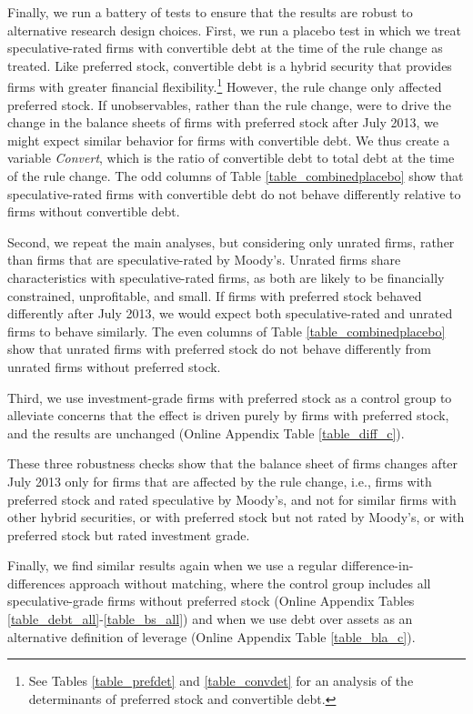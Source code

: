 \documentclass[a4paper, 12pt]{article}
\begin{document}
Finally, we run a battery of tests to ensure that the results are robust to alternative research design choices. First, we run a placebo test in which we treat speculative-rated firms with convertible debt at the time of the rule change as treated. Like preferred stock, convertible debt is a hybrid security that provides firms with greater financial flexibility.\footnote{See Tables \ref{table_prefdet} and \ref{table_convdet} for an analysis of the determinants of preferred stock and convertible debt.} However, the rule change only affected preferred stock. If unobservables, rather than the rule change, were to drive the change in the balance sheets of firms with preferred stock after July 2013, we might expect similar behavior for firms with convertible debt. We thus create a variable \textit{Convert}, which is the ratio of convertible debt to total debt at the time of the rule change. The odd columns of Table \ref{table_combinedplacebo} show that speculative-rated firms with convertible debt do not behave differently relative to firms without convertible debt.

Second, we repeat the main analyses, but considering only unrated firms, rather than firms that are speculative-rated by Moody's. Unrated firms share characteristics with speculative-rated firms, as both are likely to be financially constrained, unprofitable, and small. If firms with preferred stock behaved differently after July 2013, we would expect both speculative-rated and unrated firms to behave similarly. The even columns of Table \ref{table_combinedplacebo} show that unrated firms with preferred stock do not behave differently from unrated firms without preferred stock.

Third, we use investment-grade firms with preferred stock as a control group to alleviate concerns that the effect is driven purely by firms with preferred stock, and the results are unchanged (Online Appendix Table \ref{table_diff_c}).

These three robustness checks show that the balance sheet of firms changes after July 2013 only for firms that are affected by the rule change, i.e., firms with preferred stock and rated speculative by Moody's, and not for similar firms with other hybrid securities, or with preferred stock but not rated by Moody's, or with preferred stock but rated investment grade.

Finally, we find similar results again when we use a regular difference-in-differences approach without matching, where the control group includes all speculative-grade firms without preferred stock (Online Appendix Tables \ref{table_debt_all}-\ref{table_bs_all}) and when we use debt over assets as an alternative definition of leverage (Online Appendix Table \ref{table_bla_c}).
\end{document}
